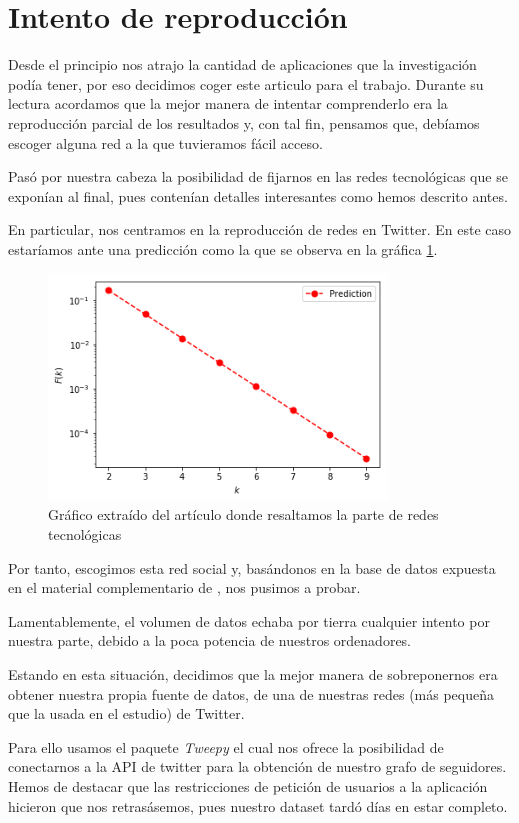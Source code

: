 \documentclass[1p]{elsarticle}
\begin{document}
\section{Intento de reproducción}
Desde el principio nos atrajo la cantidad de aplicaciones que la investigación podía tener, por eso decidimos coger este articulo para el trabajo. Durante su lectura acordamos que la mejor manera de intentar comprenderlo era la reproducción parcial de los resultados y, con tal fin, pensamos que, debíamos escoger alguna red a la que tuvieramos fácil acceso.

Pasó por nuestra cabeza la posibilidad de fijarnos en las redes tecnológicas que se exponían al final, pues contenían detalles interesantes como hemos descrito antes.

En particular, nos centramos en la reproducción de redes en Twitter. En este caso estaríamos ante una predicción como la que se observa en la gráfica \ref{h2}.
\begin{figure}
	\centering
	\includegraphics[width=9cm]{graf_4.png}
	\caption{Gráfico extraído del artículo donde resaltamos la parte de redes tecnológicas}
	\label{h2}
\end{figure}


Por tanto, escogimos esta red social y, basándonos en la base de datos expuesta en el material complementario de \cite{arti}, nos pusimos a probar.

Lamentablemente, el volumen de datos echaba por tierra cualquier intento por nuestra parte, debido a la poca potencia de nuestros ordenadores. 

Estando en esta situación, decidimos que la mejor manera de sobreponernos era obtener nuestra propia fuente de datos, de una de nuestras redes (más pequeña que la usada en el estudio) de Twitter.

Para ello usamos el paquete \textit{Tweepy} el cual nos ofrece la posibilidad de conectarnos a la API de twitter para la obtención de nuestro grafo de seguidores. Hemos de destacar que las restricciones de petición de usuarios a la aplicación hicieron que nos retrasásemos, pues nuestro dataset tardó días en estar completo.
\end{document}
